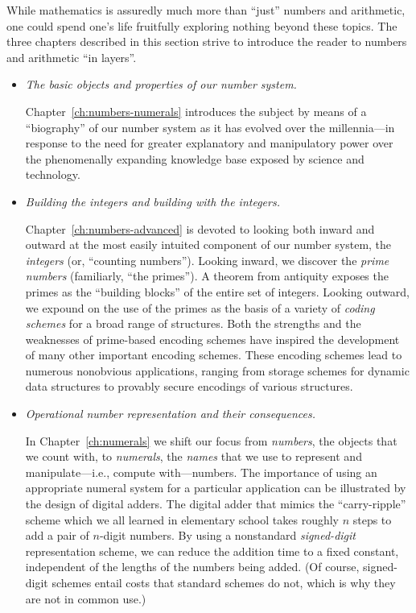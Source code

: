 
While mathematics is assuredly much more than ``just'' numbers and arithmetic, one could spend one's life fruitfully exploring nothing beyond these topics.  The three chapters described in this
section strive to introduce the reader to numbers and arithmetic ``in layers''.
\begin{itemize}
\item
{\em The basic objects and properties of our number system.}

\smallskip

Chapter~\ref{ch:numbers-numerals} introduces the subject by means of a ``biography'' of our number system as it has evolved over the millennia---in response to the need for greater explanatory and manipulatory power over the phenomenally expanding knowledge base exposed by science and technology.
\medskip\item
{\em Building the integers and building with the integers.}

\smallskip

Chapter~\ref{ch:numbers-advanced} is devoted to looking both inward and outward at the most easily intuited component of our number system, the {\em integers} (or, ``counting numbers'').  Looking inward, we discover the {\em prime numbers} (familiarly, ``the primes'').  A theorem from antiquity exposes the primes as the ``building blocks'' of the entire set of integers.  Looking outward, we expound on the use of the primes as the basis of a variety of {\em coding schemes} for a broad range of structures.  Both the strengths and the weaknesses of prime-based encoding schemes have inspired the development of many other important encoding schemes.  These encoding schemes lead to numerous nonobvious applications, ranging from storage schemes for dynamic data structures to provably secure encodings of various structures.

\medskip\item
{\em Operational number representation and their consequences.}

\smallskip

In Chapter~\ref{ch:numerals} we shift our focus from {\em numbers}, the objects that we count with, to {\em numerals}, the {\em names} that we use to represent and manipulate---i.e., compute with---numbers.  The importance of using an appropriate numeral system for a particular application can be illustrated by the design of digital adders.  The digital adder that mimics the ``carry-ripple'' scheme which we all learned in elementary school takes roughly $n$ steps to add a pair of $n$-digit numbers.  By using a nonstandard {\em signed-digit} representation scheme, we can reduce the addition time to a fixed constant, independent of the lengths of the numbers being added.  (Of course, signed-digit schemes entail costs that standard schemes do not, which
is why they are not in common use.)
\end{itemize}
